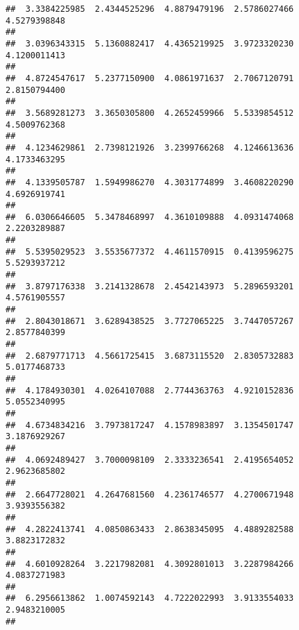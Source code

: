 \documentclass[]{article}
\begin{document}
\begin{verbatim}
##  3.3384225985  2.4344525296  4.8879479196  2.5786027466  4.5279398848 
##                                                                       
##  3.0396343315  5.1360882417  4.4365219925  3.9723320230  4.1200011413 
##                                                                       
##  4.8724547617  5.2377150900  4.0861971637  2.7067120791  2.8150794400 
##                                                                       
##  3.5689281273  3.3650305800  4.2652459966  5.5339854512  4.5009762368 
##                                                                       
##  4.1234629861  2.7398121926  3.2399766268  4.1246613636  4.1733463295 
##                                                                       
##  4.1339505787  1.5949986270  4.3031774899  3.4608220290  4.6926919741 
##                                                                       
##  6.0306646605  5.3478468997  4.3610109888  4.0931474068  2.2203289887 
##                                                                       
##  5.5395029523  3.5535677372  4.4611570915  0.4139596275  5.5293937212 
##                                                                       
##  3.8797176338  3.2141328678  2.4542143973  5.2896593201  4.5761905557 
##                                                                       
##  2.8043018671  3.6289438525  3.7727065225  3.7447057267  2.8577840399 
##                                                                       
##  2.6879771713  4.5661725415  3.6873115520  2.8305732883  5.0177468733 
##                                                                       
##  4.1784930301  4.0264107088  2.7744363763  4.9210152836  5.0552340995 
##                                                                       
##  4.6734834216  3.7973817247  4.1578983897  3.1354501747  3.1876929267 
##                                                                       
##  4.0692489427  3.7000098109  2.3333236541  2.4195654052  2.9623685802 
##                                                                       
##  2.6647728021  4.2647681560  4.2361746577  4.2700671948  3.9393556382 
##                                                                       
##  4.2822413741  4.0850863433  2.8638345095  4.4889282588  3.8823172832 
##                                                                       
##  4.6010928264  3.2217982081  4.3092801013  3.2287984266  4.0837271983 
##                                                                       
##  6.2956613862  1.0074592143  4.7222022993  3.9133554033  2.9483210005 
##                                                                       

\end{verbatim}
\end{document}
